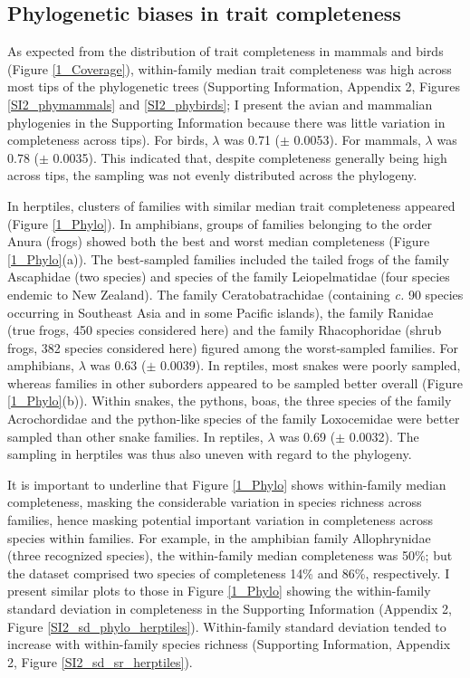 \subsection{Phylogenetic biases in trait completeness}
As expected from the distribution of trait completeness in mammals and birds (Figure \ref{1_Coverage}), within-family median trait completeness was high across most tips of the phylogenetic trees (Supporting Information, Appendix 2, Figures \ref{SI2_phymammals} and \ref{SI2_phybirds}; I present the avian and mammalian phylogenies in the Supporting Information because there was little variation in completeness across tips). For birds, $\lambda$ was 0.71 ($\pm$ 0.0053). For mammals, $\lambda$ was 0.78 ($\pm$ 0.0035). This indicated that, despite completeness generally being high across tips, the sampling was not evenly distributed across the phylogeny.

In herptiles, clusters of families with similar median trait completeness appeared (Figure \ref{1_Phylo}). In amphibians, groups of families belonging to the order Anura (frogs) showed both the best and worst median completeness (Figure \ref{1_Phylo}(a)). The best-sampled families included the tailed frogs of the family Ascaphidae (two species) and species of the family Leiopelmatidae (four species endemic to New Zealand). The family Ceratobatrachidae (containing \textit{c.} 90 species occurring in Southeast Asia and in some Pacific islands), the family Ranidae (true frogs, 450 species considered here) and the family Rhacophoridae (shrub frogs, 382 species considered here) figured among the worst-sampled families. For amphibians, $\lambda$ was 0.63 ($\pm$ 0.0039). In reptiles, most snakes were poorly sampled, whereas families in other suborders appeared to be sampled better overall (Figure \ref{1_Phylo}(b)). Within snakes, the pythons, boas, the three species of the family Acrochordidae and the python-like species of the family Loxocemidae were better sampled than other snake families. In reptiles, $\lambda$ was 0.69 ($\pm$ 0.0032). The sampling in herptiles was thus also uneven with regard to the phylogeny.

It is important to underline that Figure \ref{1_Phylo} shows within-family median completeness, masking the considerable variation in species richness across families, hence masking potential important variation in completeness across species within families. For example, in the amphibian family Allophrynidae (three recognized species), the within-family median completeness was 50\%; but the dataset comprised two species of completeness 14\% and 86\%, respectively. I present similar plots to those in Figure \ref{1_Phylo} showing the within-family standard deviation in completeness in the Supporting Information (Appendix 2, Figure \ref{SI2_sd_phylo_herptiles}). Within-family standard deviation tended to increase with within-family species richness (Supporting Information, Appendix 2, Figure \ref{SI2_sd_sr_herptiles}).

